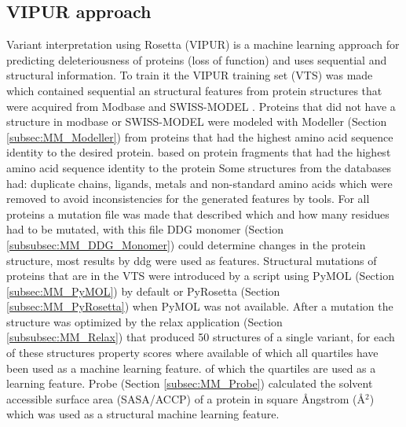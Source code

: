 \subsection{VIPUR approach}
Variant interpretation using Rosetta (VIPUR) is a machine learning approach for predicting deleteriousness of proteins (loss of function) and uses sequential and structural information. 
To train it the VIPUR training set (VTS) was made which contained sequential an structural features from protein structures that were acquired from Modbase \cite{pieper_modbase_2009} and
SWISS-MODEL \cite{guex_automated_2009,bertoni_modeling_2017,benkert_toward_2011,bienert_swiss-model_2017,waterhouse_swiss-model:_2018}.
Proteins that did not have a structure in modbase or SWISS-MODEL were modeled with Modeller (Section \ref{subsec:MM_Modeller}) from proteins that had the highest amino acid sequence identity to the desired protein.
based on protein fragments that had the highest amino acid sequence identity to the protein
Some structures from the databases had: duplicate chains, ligands, metals and non-standard amino acids which were removed to avoid inconsistencies for the generated features by tools.
For all proteins a mutation file was made that described which and how many residues had to be mutated, with this file DDG monomer (Section \ref{subsubsec:MM_DDG_Monomer}) could determine changes in the protein structure, most results by ddg were used as features.
Structural mutations of proteins that are in the VTS were introduced by a script using PyMOL (Section \ref{subsec:MM_PyMOL}) by default or PyRosetta (Section \ref{subsec:MM_PyRosetta}) when PyMOL was not available.
After a mutation the structure was optimized by the relax application (Section \ref{subsubsec:MM_Relax}) that produced 50 structures of a single variant, for each of these structures property scores where available of which all quartiles have been used as a machine learning feature.
of which the quartiles are used as a learning feature. Probe (Section \ref{subsec:MM_Probe}) calculated the solvent accessible surface area (SASA/ACCP) of a protein in square {\AA}ngstrom ({\AA}$^2$) which was used as a structural machine learning feature.  
